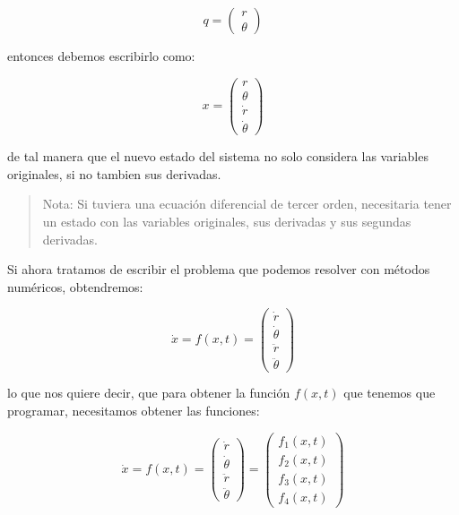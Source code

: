 \documentclass[11pt]{article}
\begin{document}
    \begin{equation}
q =
\begin{pmatrix}
r \\
\theta
\end{pmatrix}
\end{equation}

    entonces debemos escribirlo como:

    \begin{equation}
x =
\begin{pmatrix}
r \\
\theta \\
\dot{r} \\
\dot{\theta}
\end{pmatrix}
\end{equation}

    de tal manera que el nuevo estado del sistema no solo considera las
variables originales, si no tambien sus derivadas.

\begin{quote}
Nota: Si tuviera una ecuación diferencial de tercer orden, necesitaria
tener un estado con las variables originales, sus derivadas y sus
segundas derivadas.
\end{quote}

    Si ahora tratamos de escribir el problema que podemos resolver con
métodos numéricos, obtendremos:

    \begin{equation}
\dot{x} = f(x, t) =
\begin{pmatrix}
\dot{r} \\
\dot{\theta} \\
\ddot{r} \\
\ddot{\theta}
\end{pmatrix}
\end{equation}

    lo que nos quiere decir, que para obtener la función \(f(x, t)\) que
tenemos que programar, necesitamos obtener las funciones:

    \begin{equation}
\dot{x} = f(x, t) =
\begin{pmatrix}
\dot{r} \\
\dot{\theta} \\
\ddot{r} \\
\ddot{\theta}
\end{pmatrix} =
\begin{pmatrix}
f_1 (x, t) \\
f_2 (x, t) \\
f_3 (x, t) \\
f_4 (x, t)
\end{pmatrix}
\end{equation}
\end{document}
